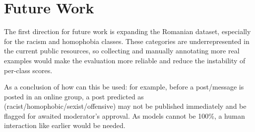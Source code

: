 \section{Future Work}
\label{sec:future_work}

The first direction for future work is expanding the Romanian dataset, especially for the racism and homophobia classes. These categories are underrepresented in the current public resources, so collecting and manually annotating more real examples would make the evaluation more reliable and reduce the instability of per-class scores.



As a conclusion of how can this be used: for example, before a post/message is posted in an online group, a post predicted as (racist/homophobic/sexist/offensive) may not be published immediately and be flagged for awaited moderator's approval. As models cannot be 100\%, a human interaction like earlier would be needed.
